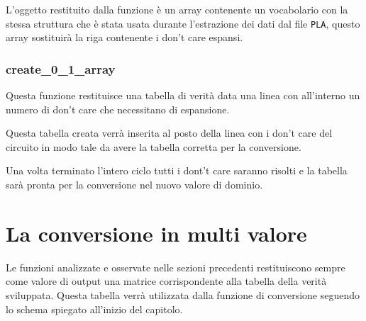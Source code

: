 \documentclass[]{book}
\newenvironment{Shaded}{\begin{snugshade}}{\end{snugshade}}
\newcommand{\BuiltInTok}[1]{#1}
\newcommand{\ControlFlowTok}[1]{\textcolor[rgb]{0.13,0.29,0.53}{\textbf{#1}}}
\newcommand{\DecValTok}[1]{\textcolor[rgb]{0.00,0.00,0.81}{#1}}
\newcommand{\KeywordTok}[1]{\textcolor[rgb]{0.13,0.29,0.53}{\textbf{#1}}}
\newcommand{\NormalTok}[1]{#1}
\newcommand{\OperatorTok}[1]{\textcolor[rgb]{0.81,0.36,0.00}{\textbf{#1}}}
\begin{document}
L'oggetto restituito dalla funzione è un array contenente un vocabolario con la stessa struttura che è stata usata durante l'estrazione dei dati dal file \texttt{PLA}, questo array sostituirà la riga contenente i don't care espansi.

\hypertarget{create_0_1_array}{%
\subsubsection{create\_0\_1\_array}\label{create_0_1_array}}

\begin{Shaded}
\end{Shaded}

Questa funzione restituisce una tabella di verità data una linea con all'interno un numero di don't care che necessitano di espansione.

Questa tabella creata verrà inserita al posto della linea con i don't care del circuito in modo tale da avere la tabella corretta per la conversione.

Una volta terminato l'intero ciclo tutti i dont't care saranno risolti e la tabella sarà pronta per la conversione nel nuovo valore di dominio.

\newpage

\hypertarget{la-conversione-in-multi-valore}{%
\section{La conversione in multi valore}\label{la-conversione-in-multi-valore}}

Le funzioni analizzate e osservate nelle sezioni precedenti restituiscono sempre come valore di output una matrice corrispondente alla tabella della verità sviluppata. Questa tabella verrà utilizzata dalla funzione di conversione seguendo lo schema spiegato all'inizio del capitolo.
\end{document}

